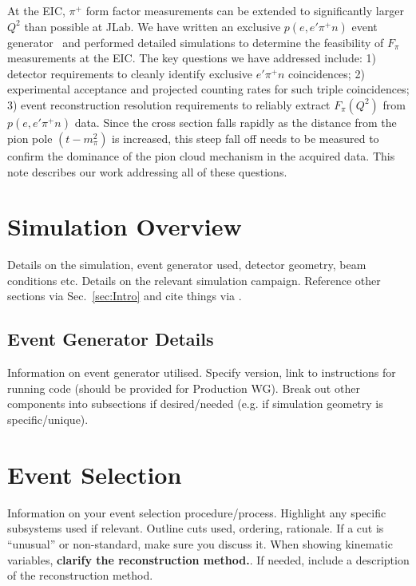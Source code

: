 \documentclass[letterpaper,12pt]{article}
\begin{document}
At the EIC, $\pi^+$ form factor measurements can be extended to significantly
larger $Q^2$ than possible at JLab.  We have written an exclusive $p(e,e'\pi^+n)$ event
generator~\cite{DEMPgen} and performed detailed simulations to determine the
feasibility of $F_{\pi}$ measurements at the EIC\@.  The key
questions we have addressed include: 1) detector requirements to cleanly identify exclusive $e' \pi^+ n$ coincidences; 2) experimental acceptance and projected counting rates for such triple
coincidences; 3) event reconstruction resolution requirements to reliably extract $F_{\pi}(Q^2)$ from $p(e,e'\pi^+n)$ data.
Since the cross section falls
rapidly as the distance from the pion pole $(t-m_{\pi}^2)$ is increased, this
steep fall off needs to be measured to confirm the dominance of the pion cloud
mechanism in the acquired data.  
This note describes our work addressing all of these questions.


\section{Simulation Overview}\label{sec:Sim_Overview}

Details on the simulation, event generator used, detector geometry, beam conditions etc. Details on the relevant simulation campaign. Reference other sections via Sec.~\ref{sec:Intro} and cite things via \cite{jr:2022_YR}.

\subsection{Event Generator Details}\label{subsec:EvGen}

Information on event generator utilised. Specify version, link to instructions for running code (should be provided for Production WG). Break out other components into subsections if desired/needed (e.g. if simulation geometry is specific/unique).

\section{Event Selection}\label{sec:EvSelect}

Information on your event selection procedure/process. Highlight any specific subsystems used if relevant. Outline cuts used, ordering, rationale. If a cut is ``unusual'' or non-standard, make sure you discuss it. When showing kinematic variables, \textbf{clarify the reconstruction method.}. If needed, include a description of the reconstruction method.
\end{document}
